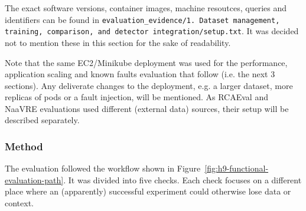 The exact software versions, container images, machine resoutces, queries and identifiers can be found in \texttt{evaluation\_evidence/1. Dataset management, training, comparison, and detector integration/setup.txt}. It was decided not to mention these in this section for the sake of readability.

Note that the same EC2/Minikube deployment was used for the performance, application scaling and known faults evaluation that follow (i.e. the next 3 sections). Any deliverate changes to the deployment, e.g. a larger dataset, more replicas of pods or a fault injection, will be mentioned. As RCAEval and NaaVRE evaluations used different (external data) sources, their setup will be described separately.

\subsubsection{Method}

The evaluation followed the workflow shown in Figure~\ref{fig:h9-functional-evaluation-path}. It was divided into five checks. Each check focuses on a different place where an (apparently) successful experiment could otherwise lose data or context.


